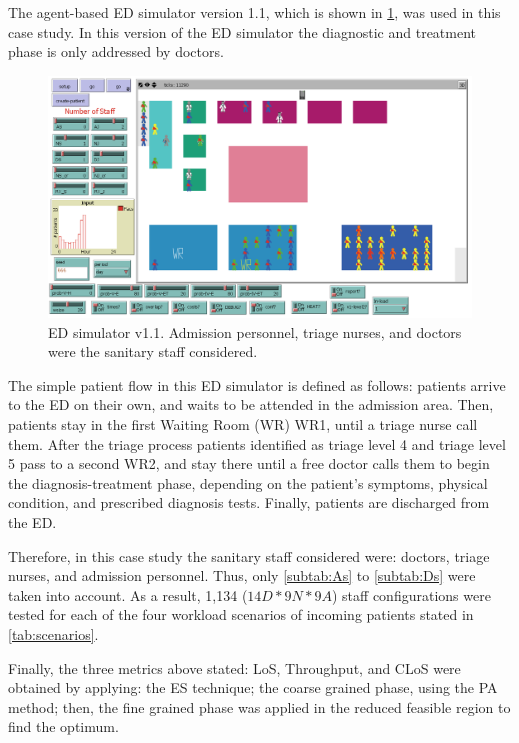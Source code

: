 \documentclass[11pt]{article} %
\begin{document}
The agent-based ED simulator version 1.1, which is shown in \ref{fig:ED-SIM-0},
was used in this case study. In this version of the ED simulator the
diagnostic and treatment phase is only addressed by doctors. 
\begin{figure}[h]
\noindent \begin{centering}
\centering \includegraphics[width=0.9\columnwidth,height=0.16\paperheight]{figs2/ED_Netlogo-0}
\par\end{centering}

\noindent \caption{ED simulator v1.1. Admission personnel, triage nurses, and doctors
were the sanitary staff considered.}


\label{fig:ED-SIM-0} 
\end{figure}
 The simple patient flow in this ED simulator is defined as follows:
patients arrive to the ED on their own, and waits to be attended in
the admission area. Then, patients stay in the first Waiting Room
(WR) WR1, until a triage nurse call them. After the triage process
patients identified as triage level 4 and triage level 5 pass to a
second WR2, and stay there until a free doctor calls them to begin
the diagnosis-treatment phase, depending on the patient's symptoms,
physical condition, and prescribed diagnosis tests. Finally, patients
are discharged from the ED. 

Therefore, in this case study the sanitary staff considered were:
doctors, triage nurses, and admission personnel. Thus, only \ref{subtab:As}
to \ref{subtab:Ds} were taken into account. As a result, 1,134 ($14D*9N*9A$)
staff configurations were tested for each of the four workload scenarios
of incoming patients stated in \ref{tab:scenarios}. 

Finally, the three metrics above stated: LoS, Throughput, and CLoS
were obtained by applying: the ES technique; the coarse grained phase,
using the PA method; then, the fine
grained phase was applied in the reduced feasible region to find the
optimum.
\end{document}
